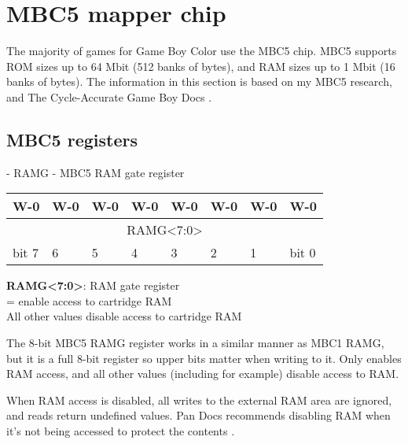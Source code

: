 
\chapter{MBC5 mapper chip}

The majority of games for Game Boy Color use the MBC5 chip. MBC5 supports ROM
sizes up to 64 Mbit (512 banks of  bytes), and RAM sizes up to 1 Mbit
(16 banks of  bytes). The information in this section is based on my
MBC5 research, and The Cycle-Accurate Game Boy Docs \cite{tcagbd}.

\section{MBC5 registers}

\begin{register}[H]
  \caption{ - RAMG - MBC5 RAM gate register}
  {
    \ttfamily
    \begin{tabularx}{\textwidth}{|X|X|X|X|X|X|X|X|}
      \hline
      W-0 & W-0 & W-0 & W-0 & W-0 & W-0 & W-0 & W-0 \\
      \hline
      \multicolumn{8}{|c|}{RAMG<7:0>} \\
      \hline
      bit 7 & 6 & 5 & 4 & 3 & 2 & 1 & bit 0 \\
      \hline
    \end{tabularx}
  }

  \begin{description}[leftmargin=5em, style=nextline]
    \item[bit 7-0]
      \textbf{RAMG<7:0>}: RAM gate register \\
      = enable access to cartridge RAM \\
      All other values disable access to cartridge RAM
  \end{description}
\end{register}

The 8-bit MBC5 RAMG register works in a similar manner as MBC1 RAMG, but it is
a full 8-bit register so upper bits matter when writing to it. Only
 enables RAM access, and all other values (including
 for example) disable access to RAM.

When RAM access is disabled, all writes to the external RAM area
 are ignored, and reads return undefined values. Pan Docs
recommends disabling RAM when it's not being accessed to protect the contents
\cite{pandocs}.


